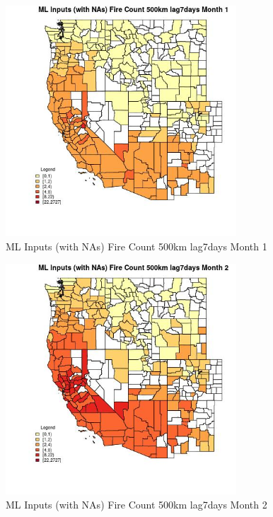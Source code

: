 \begin{figure} 
\centering  
\includegraphics[width=0.77\textwidth]{Code_Outputs/Report_ML_input_PM25_Step4_part_f_de_duplicated_aves_prioritize_24hr_obswNAs_CountyFire_Count_500km_lag7daysmedianMonth1.jpg} 
\caption{\label{fig:Report_ML_input_PM25_Step4_part_f_de_duplicated_aves_prioritize_24hr_obswNAsCountyFire_Count_500km_lag7daysmedianMonth1}ML Inputs (with NAs) Fire Count 500km lag7days Month 1} 
\end{figure} 
 

\begin{figure} 
\centering  
\includegraphics[width=0.77\textwidth]{Code_Outputs/Report_ML_input_PM25_Step4_part_f_de_duplicated_aves_prioritize_24hr_obswNAs_CountyFire_Count_500km_lag7daysmedianMonth2.jpg} 
\caption{\label{fig:Report_ML_input_PM25_Step4_part_f_de_duplicated_aves_prioritize_24hr_obswNAsCountyFire_Count_500km_lag7daysmedianMonth2}ML Inputs (with NAs) Fire Count 500km lag7days Month 2} 
\end{figure} 
 

